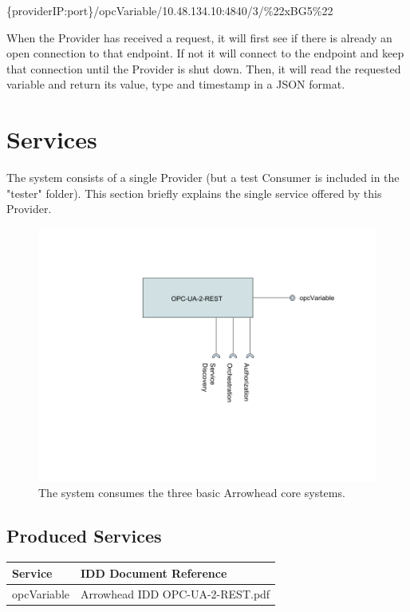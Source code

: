 \documentclass[a4paper]{arrowhead}
\begin{document}
\begin{tcolorbox}[colback=white!5!white,colframe=black!75!black,title=HTTP GET that is sent to the Provider]
\{providerIP:port\}/opcVariable/10.48.134.10:4840/3/\%22xBG5\%22
\end{tcolorbox}

When the Provider has received a request, it will first see if there is already an open connection to that endpoint. If not it will connect to the endpoint and keep that connection until the Provider is shut down. Then, it will read the requested variable and return its value, type and timestamp in a JSON format.


\section{Services}
\label{sec:services}

The system consists of a single Provider (but a test Consumer is included in the "tester" folder). This section briefly explains the single service offered by this Provider.

\begin{figure}[h]
  \center
  \includegraphics[scale=.6]{fig/OPC-2-REST_SysD.png}
  \caption{The system consumes the three basic Arrowhead core systems.}
  \label{fig:sysd}
\end{figure}

\subsection{Produced Services}
\noindent\begin{tabularx}{\textwidth}{| p{5.8cm} | X |} \hline
\rowcolor{gray!33} Service & IDD Document Reference \\ \hline

opcVariable                  & Arrowhead IDD OPC-UA-2-REST.pdf \\ \hline

\end{tabularx}
\end{document}
